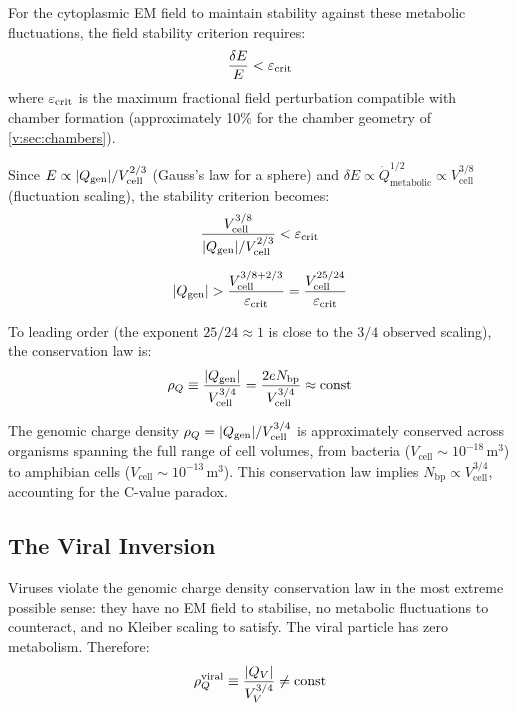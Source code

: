 For the cytoplasmic EM field to maintain stability against these metabolic fluctuations, the field stability criterion requires:
\begin{equation}
  \frac{\delta E}{E} < \varepsilon_{\mathrm{crit}}
\end{equation}
where $\varepsilon_{\mathrm{crit}}$ is the maximum fractional field perturbation compatible with chamber formation (approximately 10\% for the chamber geometry of \cref{v:sec:chambers}).

Since $E \propto \abs{Q_{\mathrm{gen}}} / V_{\mathrm{cell}}^{2/3}$ (Gauss's law for a sphere) and $\delta E \propto \dot{Q}_{\mathrm{metabolic}}^{1/2} \propto V_{\mathrm{cell}}^{3/8}$ (fluctuation scaling), the stability criterion becomes:
\begin{equation}
  \frac{V_{\mathrm{cell}}^{3/8}}{\abs{Q_{\mathrm{gen}}} / V_{\mathrm{cell}}^{2/3}} < \varepsilon_{\mathrm{crit}}
\end{equation}

\begin{equation}
  \abs{Q_{\mathrm{gen}}} > \frac{V_{\mathrm{cell}}^{3/8 + 2/3}}{\varepsilon_{\mathrm{crit}}} = \frac{V_{\mathrm{cell}}^{25/24}}{\varepsilon_{\mathrm{crit}}}
\end{equation}

To leading order (the exponent $25/24 \approx 1$ is close to the $3/4$ observed scaling), the conservation law is:
\begin{equation}
  \rho_Q \equiv \frac{\abs{Q_{\mathrm{gen}}}}{V_{\mathrm{cell}}^{3/4}} = \frac{2e N_{\mathrm{bp}}}{V_{\mathrm{cell}}^{3/4}} \approx \mathrm{const}
  \label{v:eq:rhoQ_conservation}
\end{equation}

\begin{theorem}
\label{v:thm:cvalue}
The genomic charge density $\rho_Q = \abs{Q_{\mathrm{gen}}} / V_{\mathrm{cell}}^{3/4}$ is approximately conserved across organisms spanning the full range of cell volumes, from bacteria ($V_{\mathrm{cell}} \sim 10^{-18}$\,m$^3$) to amphibian cells ($V_{\mathrm{cell}} \sim 10^{-13}$\,m$^3$). This conservation law implies $N_{\mathrm{bp}} \propto V_{\mathrm{cell}}^{3/4}$, accounting for the C-value paradox.
\end{theorem}

\subsection{The Viral Inversion}

Viruses violate the genomic charge density conservation law in the most extreme possible sense: they have no EM field to stabilise, no metabolic fluctuations to counteract, and no Kleiber scaling to satisfy. The viral particle has zero metabolism. Therefore:
\begin{equation}
  \rho_Q^{\mathrm{viral}} \equiv \frac{\abs{Q_V}}{V_V^{3/4}} \neq \mathrm{const}
\end{equation}

